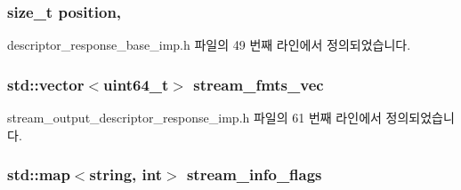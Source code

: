 \subsubsection[{\texorpdfstring{position}{position}}]{\setlength{\rightskip}{0pt plus 5cm}size\+\_\+t position\hspace{0.3cm}{\ttfamily [protected]}, {\ttfamily [inherited]}}\hypertarget{classavdecc__lib_1_1descriptor__response__base__imp_a7a04afe5347934be732ec70a70bd0a28}{}\label{classavdecc__lib_1_1descriptor__response__base__imp_a7a04afe5347934be732ec70a70bd0a28}


descriptor\+\_\+response\+\_\+base\+\_\+imp.\+h 파일의 49 번째 라인에서 정의되었습니다.

\subsubsection[{\texorpdfstring{stream\+\_\+fmts\+\_\+vec}{stream_fmts_vec}}]{\setlength{\rightskip}{0pt plus 5cm}std\+::vector$<${\bf uint64\+\_\+t}$>$ stream\+\_\+fmts\+\_\+vec\hspace{0.3cm}{\ttfamily [private]}}\hypertarget{classavdecc__lib_1_1stream__output__descriptor__response__imp_a1fd13ea03cfad2d7e41d304eb40af49a}{}\label{classavdecc__lib_1_1stream__output__descriptor__response__imp_a1fd13ea03cfad2d7e41d304eb40af49a}


stream\+\_\+output\+\_\+descriptor\+\_\+response\+\_\+imp.\+h 파일의 61 번째 라인에서 정의되었습니다.

\subsubsection[{\texorpdfstring{stream\+\_\+info\+\_\+flags}{stream_info_flags}}]{\setlength{\rightskip}{0pt plus 5cm}std\+::map$<$string, int$>$ stream\+\_\+info\+\_\+flags\hspace{0.3cm}{\ttfamily [private]}}\hypertarget{classavdecc__lib_1_1stream__output__descriptor__response__imp_a7a5f929ce40eaf804944218314bff706}{}\label{classavdecc__lib_1_1stream__output__descriptor__response__imp_a7a5f929ce40eaf804944218314bff706}


